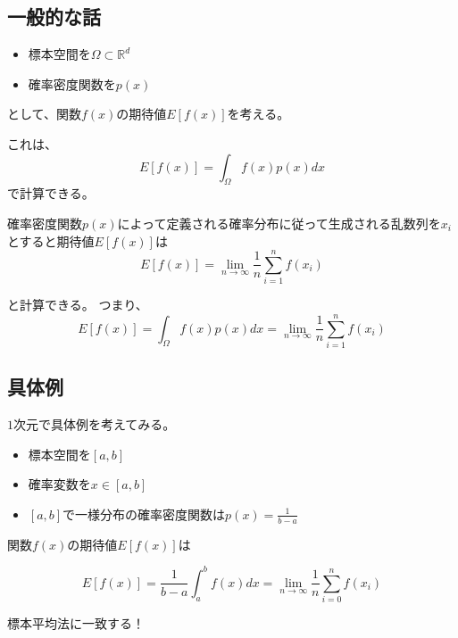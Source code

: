 \documentclass[dvipdfmx]{beamer}
\begin{document}
    \subsection{一般的な話}
    \begin{frame}{\insertsubsection}

        \begin{itemize}
            \item 標本空間を$\Omega \subset \mathbb{R}^d$
            \item 確率密度関数を$p(x)$
        \end{itemize}

        として、関数$f(x)$の期待値$E[f(x)]$を考える。

        これは、
        \begin{equation}
            E[f(x)] = \int_\Omega f(x)p(x) dx
        \end{equation}
        で計算できる。

    \end{frame}

    \begin{frame}
        確率密度関数$p(x)$によって定義される確率分布に従って生成される乱数列を$x_i$とすると期待値$E[f(x)]$は
        \begin{equation}
            E[f(x)] = \lim_{n \to \infty}\dfrac{1}{n}\sum_{i=1}^n f(x_i)
        \end{equation}

        と計算できる。
        つまり、
        \begin{equation}
            E[f(x)] = \int_\Omega f(x)p(x) dx = \lim_{n \to \infty}\dfrac{1}{n}\sum_{i=1}^n f(x_i)
        \end{equation}

    \end{frame}

    \subsection{具体例}
    \begin{frame}{\insertsubsection}
        $1$次元で具体例を考えてみる。

        \begin{itemize}
            \item 標本空間を$[a,b]$
            \item 確率変数を$x \in [a,b]$
            \item $[a,b]$で一様分布の確率密度関数は$p(x) = \frac{1}{b-a}$
        \end{itemize}

        関数$f(x)$の期待値$E[f(x)]$は

        \begin{equation}
            E[f(x)] = \dfrac{1}{b-a}\int_a^b f(x) dx = \lim_{n\to\infty}\dfrac{1}{n}\sum_{i=0}^n f(x_i)
        \end{equation}

        \alert{標本平均法に一致する！}

    \end{frame}
\end{document}

